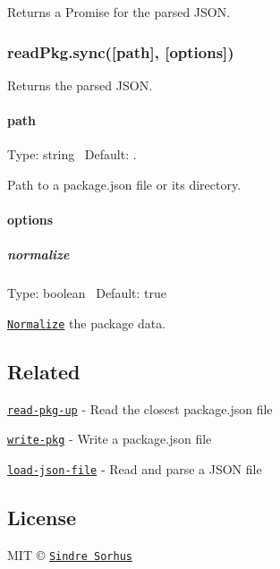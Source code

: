 Returns a {\ttfamily Promise} for the parsed J\+S\+ON.

\subsubsection*{read\+Pkg.\+sync(\mbox{[}path\mbox{]}, \mbox{[}options\mbox{]})}

Returns the parsed J\+S\+ON.

\paragraph*{path}

Type\+: {\ttfamily string}~\newline
 Default\+: {\ttfamily .}

Path to a {\ttfamily package.\+json} file or its directory.

\paragraph*{options}

\subparagraph*{normalize}

Type\+: {\ttfamily boolean}~\newline
 Default\+: {\ttfamily true}

\href{https://github.com/npm/normalize-package-data#what-normalization-currently-entails}{\tt Normalize} the package data.

\subsection*{Related}


\begin{DoxyItemize}
\item \href{https://github.com/sindresorhus/read-pkg-up}{\tt read-\/pkg-\/up} -\/ Read the closest package.\+json file
\item \href{https://github.com/sindresorhus/write-pkg}{\tt write-\/pkg} -\/ Write a {\ttfamily package.\+json} file
\item \href{https://github.com/sindresorhus/load-json-file}{\tt load-\/json-\/file} -\/ Read and parse a J\+S\+ON file
\end{DoxyItemize}

\subsection*{License}

M\+IT © \href{https://sindresorhus.com}{\tt Sindre Sorhus} 